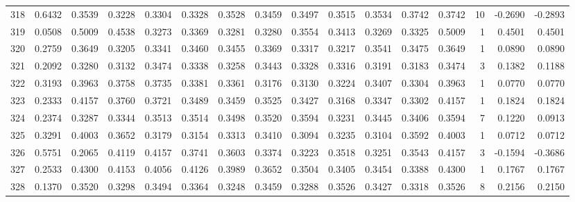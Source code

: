 \begin{tabular}{lrrrrrrrrrrrrrrr}
318 &      0.6432 &  0.3539 &  0.3228 &  0.3304 &  0.3328 &  0.3528 &  0.3459 &  0.3497 &  0.3515 &  0.3534 &   0.3742 &     0.3742 &     10 &                   -0.2690 &                    -0.2893 \\
319 &      0.0508 &  0.5009 &  0.4538 &  0.3273 &  0.3369 &  0.3281 &  0.3280 &  0.3554 &  0.3413 &  0.3269 &   0.3325 &     0.5009 &      1 &                    0.4501 &                     0.4501 \\
320 &      0.2759 &  0.3649 &  0.3205 &  0.3341 &  0.3460 &  0.3455 &  0.3369 &  0.3317 &  0.3217 &  0.3541 &   0.3475 &     0.3649 &      1 &                    0.0890 &                     0.0890 \\
321 &      0.2092 &  0.3280 &  0.3132 &  0.3474 &  0.3338 &  0.3258 &  0.3443 &  0.3328 &  0.3316 &  0.3191 &   0.3183 &     0.3474 &      3 &                    0.1382 &                     0.1188 \\
322 &      0.3193 &  0.3963 &  0.3758 &  0.3735 &  0.3381 &  0.3361 &  0.3176 &  0.3130 &  0.3224 &  0.3407 &   0.3304 &     0.3963 &      1 &                    0.0770 &                     0.0770 \\
323 &      0.2333 &  0.4157 &  0.3760 &  0.3721 &  0.3489 &  0.3459 &  0.3525 &  0.3427 &  0.3168 &  0.3347 &   0.3302 &     0.4157 &      1 &                    0.1824 &                     0.1824 \\
324 &      0.2374 &  0.3287 &  0.3344 &  0.3513 &  0.3514 &  0.3498 &  0.3520 &  0.3594 &  0.3231 &  0.3445 &   0.3406 &     0.3594 &      7 &                    0.1220 &                     0.0913 \\
325 &      0.3291 &  0.4003 &  0.3652 &  0.3179 &  0.3154 &  0.3313 &  0.3410 &  0.3094 &  0.3235 &  0.3104 &   0.3592 &     0.4003 &      1 &                    0.0712 &                     0.0712 \\
326 &      0.5751 &  0.2065 &  0.4119 &  0.4157 &  0.3741 &  0.3603 &  0.3374 &  0.3223 &  0.3518 &  0.3251 &   0.3543 &     0.4157 &      3 &                   -0.1594 &                    -0.3686 \\
327 &      0.2533 &  0.4300 &  0.4153 &  0.4056 &  0.4126 &  0.3989 &  0.3652 &  0.3504 &  0.3405 &  0.3454 &   0.3388 &     0.4300 &      1 &                    0.1767 &                     0.1767 \\
328 &      0.1370 &  0.3520 &  0.3298 &  0.3494 &  0.3364 &  0.3248 &  0.3459 &  0.3288 &  0.3526 &  0.3427 &   0.3318 &     0.3526 &      8 &                    0.2156 &                     0.2150 \\

\end{tabular}
